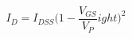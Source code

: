 \documentclass[preview]{standalone}
\begin{document}
\begin{align*}
I_D = I_{DSS}\big(1-\dfrac{V_{GS}}{V_P}
ight)^2
\end{align*}
\end{document}
